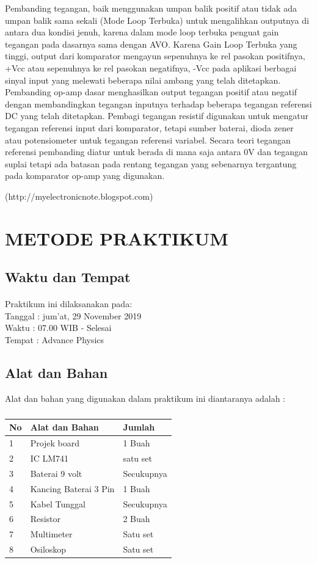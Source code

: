 \documentclass[12pt,a4paper]{article}
\begin{document}
Pembanding tegangan, baik menggunakan umpan balik positif atau tidak ada umpan balik sama sekali (Mode Loop Terbuka) untuk mengalihkan outputnya di antara dua kondisi jenuh, karena dalam mode loop terbuka penguat gain tegangan pada dasarnya sama dengan AVO. Karena Gain Loop Terbuka yang tinggi, output dari komparator mengayun sepenuhnya ke rel pasokan positifnya, +Vcc atau sepenuhnya ke rel pasokan negatifnya, -Vcc pada aplikasi berbagai sinyal input yang melewati beberapa nilai ambang yang telah ditetapkan. Pembanding op-amp dasar menghasilkan output tegangan positif atau negatif dengan membandingkan tegangan inputnya terhadap beberapa tegangan referensi DC yang telah ditetapkan. Pembagi tegangan resistif digunakan untuk mengatur tegangan referensi input dari komparator, tetapi sumber baterai, dioda zener atau potensiometer untuk tegangan referensi variabel. Secara teori tegangan referensi pembanding diatur untuk berada di mana saja antara 0V dan tegangan suplai tetapi ada batasan pada rentang tegangan yang sebenarnya tergantung pada komparator op-amp yang digunakan.
	
\begin{flushright}
(http://myelectronicnote.blogspot.com) 
\end{flushright}


\newpage
\section{METODE PRAKTIKUM}
\subsection{Waktu dan Tempat}
\paragraph{ }
Praktikum ini dilaksanakan pada:
\\ 		Tanggal : jum'at, 29 November 2019
\\ 		Waktu : 07.00 WIB - Selesai
\\ 		Tempat : Advance Physics 


\subsection{Alat dan Bahan}
Alat dan bahan yang digunakan dalam praktikum ini diantaranya adalah : 
\subparagraph*{ }
\begin{tabular}{|l|l|l|}  \hline
No & Alat dan Bahan  & Jumlah  \\ \hline
1  & Projek board & 1 Buah \\ \hline
2  & IC LM741 & satu set \\ \hline
3  & Baterai 9 volt & Secukupnya \\ \hline
4  & Kancing Baterai 3 Pin & 1 Buah \\ \hline
5  & Kabel Tunggal  & Secukupnya \\ \hline
6  & Resistor  & 2 Buah \\ \hline
7  & Multimeter & Satu set \\ \hline
8  & Osiloskop & Satu set \\ \hline
\end{tabular}
\end{document}
